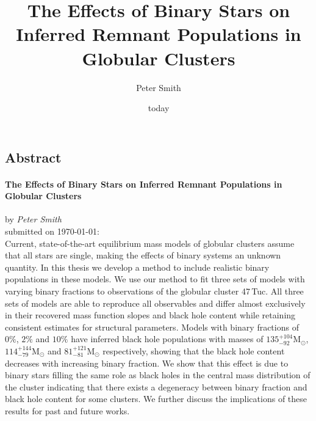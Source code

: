\documentclass[12pt, oneside]{smuthesis}
\begin{document}
\frontmatter
\title{\sc The Effects of Binary Stars on Inferred Remnant Populations in Globular Clusters}
\author{Peter Smith}
\date{today}
\medskip

\maketitle
\pagestyle{headings}





\renewcommand{\ps}[1]{{\color{NavyBlue} Peter: #1}}


\begin{center}
    \section*{\center \sc Abstract}
    \paragraph*{\center \sc The Effects of Binary Stars on Inferred Remnant Populations in Globular Clusters\\}
    by {\em Peter Smith}\\
    submitted on \today:\\

    Current, state-of-the-art equilibrium mass models of globular clusters assume that all stars are
    single, making the effects of binary systems an unknown quantity. In this thesis we develop a
    method to include realistic binary populations in these models. We use our method to fit three
    sets of models with varying binary fractions to observations of the globular cluster 47\,Tuc.
    All three sets of models are able to reproduce all observables and differ almost exclusively in
    their recovered mass function slopes and black hole content while retaining consistent estimates
    for structural parameters. Models with binary fractions of $0\%$, $2\%$ and $10\%$ have inferred
    black hole populations with masses of $135^{+104}_{-92} \mathrm{M}_\odot$, $114^{+144}_{-79}
    \mathrm{M}_\odot$ and $81 ^{+121}_{-81} \mathrm{M}_\odot$ respectively, showing that the black
    hole content decreases with increasing binary fraction. We show that this effect is due to
    binary stars filling the same role as black holes in the central mass distribution of the
    cluster indicating that there exists a degeneracy between binary fraction and black hole content
    for some clusters. We further discuss the implications of these results for past and future
    works.


\end{center}
\newpage
\end{document}

